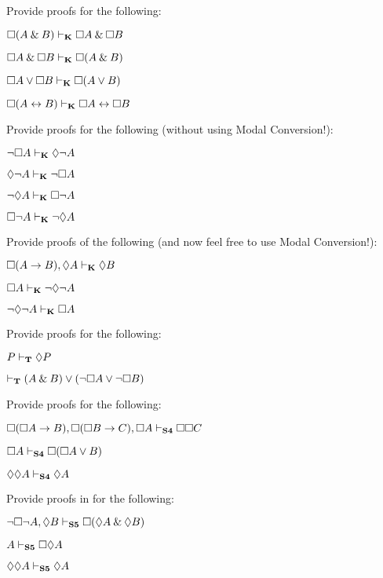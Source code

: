 \begin{practiceproblems}

\problempart
Provide proofs for the following:
\begin{earg}
	\item $\Box (A\mathbin{\&} B)\vdash_{\mathbf{K}}\Box A \mathbin{\&} \Box B$
	\item $\Box A\mathbin{\&}\Box B\vdash_{\mathbf{K}}\Box( A \mathbin{\&}  B)$
	\item $\Box A\vee\Box B\vdash_{\mathbf{K}}\Box( A \vee  B)$
	\item $\Box (A \leftrightarrow B)\vdash_{\mathbf{K}} \Box A \leftrightarrow \Box B$
\end{earg}

\problempart
Provide proofs for the following (without using Modal Conversion!):
\begin{earg}
	\item $\neg\Box A\vdash_{\mathbf{K}} \Diamond \neg A$
	\item $\Diamond\neg A\vdash_{\mathbf{K}}\neg \Box A$
	\item $\neg\Diamond A\vdash_{\mathbf{K}}\Box\neg A$
	\item $\Box\neg A\vdash_{\mathbf{K}}\neg\Diamond A$
\end{earg}

\problempart
Provide proofs of the following (and now feel free to use Modal Conversion!):
\begin{earg}
	\item $\Box(A\rightarrow B), \Diamond A \vdash_{\mathbf{K}} \Diamond B$
	\item $\Box A \vdash_{\mathbf{K}} \neg\Diamond\neg A$
	\item $\neg\Diamond\neg A \vdash_{\mathbf{K}} \Box A$
\end{earg}

\problempart
Provide proofs for the following:
\begin{earg}
	\item $P\vdash_{\mathbf{T}}\Diamond P$
	\item $\vdash_{\mathbf{T}} (A\mathbin{\&} B)\vee(\neg \Box A\vee\neg\Box B)$
\end{earg}

\problempart
Provide proofs for the following:
\begin{earg}
	\item $\Box(\Box A\rightarrow B), \Box (\Box B\rightarrow C), \Box A \vdash_{\mathbf{S4}} \Box\Box C$
	\item $\Box A \vdash_{\mathbf{S4}} \Box(\Box A \vee B)$
	\item $\Diamond \Diamond A \vdash_{\mathbf{S4}} \Diamond A$
\end{earg}


\problempart
Provide proofs in \mlSfive{} for the following:
\begin{earg}
	\item $\neg\Box\neg A, \Diamond B\vdash_{\mathbf{S5}} \Box(\Diamond A \mathbin{\&} \Diamond B)$
	\item $A \vdash_{\mathbf{S5}}  \Box\Diamond A$
	\item $\Diamond\Diamond A\vdash_{\mathbf{S5}}  \Diamond A$
\end{earg}

\end{practiceproblems}

